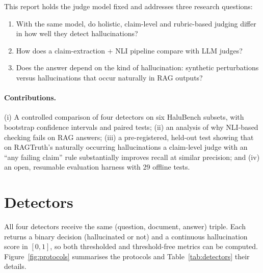 \documentclass[11pt,a4paper]{article}
\begin{document}
This report holds the judge model fixed and addresses three research questions:
\begin{enumerate}[label=\textbf{RQ\arabic*.}, leftmargin=*]
  \item With the same model, do holistic, claim-level and rubric-based judging differ
        in how well they detect hallucinations?
  \item How does a claim-extraction + NLI pipeline compare with LLM judges?
  \item Does the answer depend on the kind of hallucination: synthetic perturbations
        versus hallucinations that occur naturally in RAG outputs?
\end{enumerate}

\paragraph{Contributions.}
(i) A controlled comparison of four detectors on six HaluBench subsets, with bootstrap
confidence intervals and paired tests; (ii) an analysis of why NLI-based checking fails
on RAG answers; (iii) a pre-registered, held-out test showing that on RAGTruth's
naturally occurring hallucinations a claim-level judge with an ``any failing claim''
rule substantially improves recall at similar precision; and (iv) an open, resumable evaluation harness with 29
offline tests.

\section{Detectors}
\label{sec:detectors}

All four detectors receive the same (question, document, answer) triple. Each returns
a binary decision (hallucinated or not) and a continuous hallucination score in
$[0,1]$, so both thresholded and threshold-free metrics can be computed.
Figure~\ref{fig:protocols} summarises the protocols and Table~\ref{tab:detectors} their
details.
\end{document}
